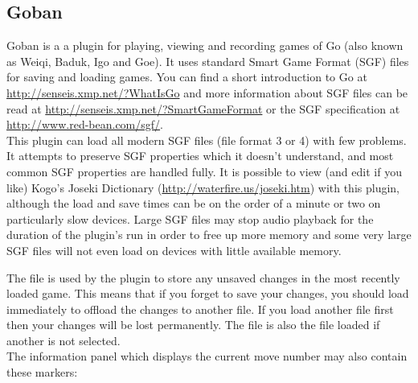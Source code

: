 \subsection{Goban}
Goban is a a plugin for playing, viewing and recording games of Go (also known
as Weiqi, Baduk, Igo and Goe).  It uses standard Smart Game Format (SGF) files
for saving and loading games.  You can find a short introduction to Go at
\url{http://senseis.xmp.net/?WhatIsGo} and more information about SGF files
can be read at \url{http://senseis.xmp.net/?SmartGameFormat} or the SGF
specification at \url{http://www.red-bean.com/sgf/}.\\

This plugin can load all modern SGF files (file format 3 or 4) with few problems.
It attempts to preserve SGF properties which it doesn't understand, and most common
SGF properties are handled fully.  It is possible to view (and edit if you like)
Kogo's Joseki Dictionary (\url{http://waterfire.us/joseki.htm}) with this plugin,
although the load and save times can be on the order of a minute or two on
particularly slow devices.  Large SGF files may stop audio playback for the duration
of the plugin's run in order to free up more memory and some very large SGF files will
not even load on devices with little available memory.\\


The file  is used by the plugin to store any unsaved
changes in the most recently loaded game.  This means that if you forget to save your
changes, you should load  immediately to offload the changes
to another file.  If you load another file first then your changes will be lost
permanently.  The  file is also the file loaded if another
is not selected.\\

The information panel which displays the current move number may also contain
these markers: 

